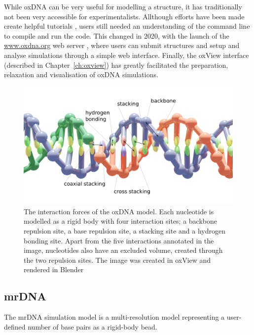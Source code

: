 

While oxDNA can be very useful for modelling a structure, it has traditionally not been very accessible for experimentalists. Allthough efforts have been made create helpful tutorials \cite{doye2020oxdna}, users still needed an understanding of the command line to compile and run the code. This changed in 2020, with the launch of the \url{www.oxdna.org} web server \cite{oxdna.org}, where users can submit structures and setup and analyse simulations through a simple web interface. Finally, the oxView interface (described in Chapter~\ref{ch:oxview}) has greatly facilitated the preparation, relaxation and visualisation of oxDNA simulations. 

\begin{figure}[ht]
\begin{center}
    \includegraphics[width=\textwidth]{figures/oxdna_annot.png}
    \caption{The interaction forces of the oxDNA model. Each nucleotide is modelled as a rigid body with four interaction sites; a backbone repulsion site, a base repulsion site, a stacking site and a hydrogen bonding site. Apart from the five interactions annotated in the image, nucleotides also have an excluded volume, created through the two repulsion sites. The image was created in oxView and rendered in Blender}
    \label{fig_oxDNA}
    \end{center}
\end{figure}

\subsection{mrDNA}
\label{sec:mrdna}
The mrDNA simulation model \cite{maffeo2019mrdna} is a multi-resolution model representing a user-defined number of base pairs as a rigid-body bead.


